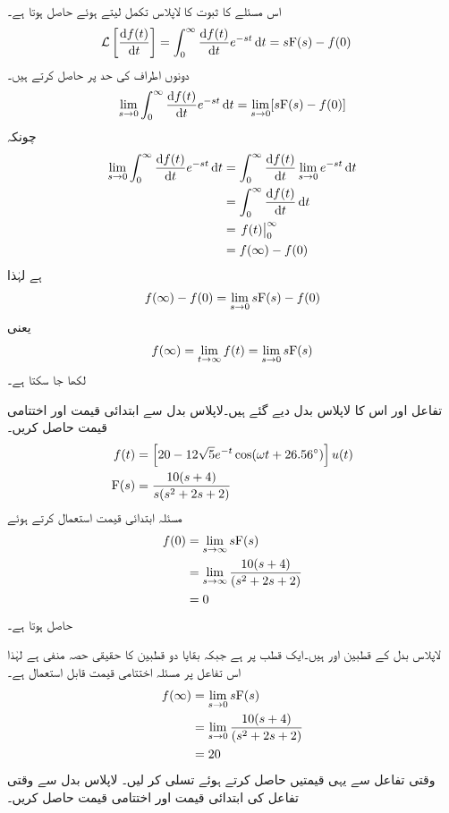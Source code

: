اس مسئلے کا ثبوت  کا لاپلاس تکمل لیتے ہوئے حاصل ہوتا ہے۔
\begin{align*}
\Laplace\left[\frac{\dif f(t)}{\dif t}\right]&=\int_0^{\infty} \frac{\dif f(t)}{\dif t} e^{-st} \dif t=s\bF(s)-f(0)
\end{align*}
دونوں اطراف کی حد  پر حاصل کرتے ہیں۔
\begin{align*}
\lim_{s \to 0}\int_0^{\infty} \frac{\dif f(t)}{\dif t} e^{-st} \dif t=\lim_{s \to 0}[s\bF(s)-f(0)]
\end{align*}
چونکہ
\begin{align*}
\lim_{s \to 0}\int_0^{\infty} \frac{\dif f(t)}{\dif t} e^{-st} \dif t&=\int_0^{\infty} \frac{\dif f(t)}{\dif t} \lim_{s \to 0}e^{-st} \dif t\\
&=\int_0^{\infty} \frac{\dif f(t)}{\dif t} \dif t\\
&=\left. f(t) \right|_{0}^{\infty}\\
&=f(\infty)-f(0)
\end{align*}
ہے لہٰذا
\begin{align*}
f(\infty)-f(0)=\lim_{s \to 0} s{{\textup{F}}}(s)-f(0)
\end{align*}
یعنی
\begin{align*}
f(\infty)=\lim_{t \to \infty}f(t)=\lim_{s \to 0} s{{\textup{F}}}(s)
\end{align*}
لکھا جا سکتا ہے۔

تفاعل اور اس کا لاپلاس بدل دیے گئے ہیں۔لاپلاس بدل سے ابتدائی قیمت  اور اختتامی قیمت  حاصل کریں۔
\begin{align*}
f(t)&=\left[20-12\sqrt{5} e^{-t} \cos(\omega t+26.56^{\circ})\right]u(t)\\
{{\textup{F}}}(s)&=\frac{10(s+4)}{s(s^2+2s+2)}
\end{align*}
مسئلہ ابتدائی قیمت استعمال کرتے ہوئے
\begin{align*}
f(0)&=\lim_{s \to \infty} s{{\textup{F}}}(s)\\
&=\lim_{s \to \infty} \frac{10(s+4)}{(s^2+2s+2)}\\
&=0
\end{align*}
حاصل ہوتا ہے۔

لاپلاس بدل کے قطبین  اور   ہیں۔ایک قطب  پر ہے جبکہ بقایا دو قطبین کا حقیقی حصہ منفی ہے لہٰذا اس تفاعل پر مسئلہ اختتامی قیمت قابل استعمال ہے۔
\begin{align*}
f(\infty)&=\lim_{s \to 0} s{{\textup{F}}}(s)\\
&=\lim_{s \to 0} \frac{10(s+4)}{(s^2+2s+2)}\\
&=20
\end{align*}
وقتی تفاعل  سے یہی قیمتیں حاصل کرتے ہوئے تسلی کر لیں۔
لاپلاس بدل  سے وقتی تفاعل  کی ابتدائی قیمت اور اختتامی قیمت حاصل کریں۔

